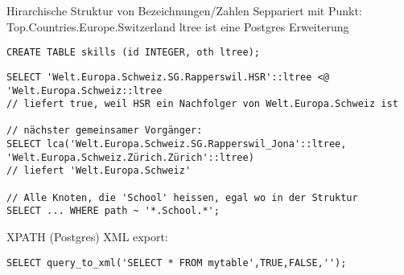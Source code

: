 \documentclass[ngerman,a4paper,12pt]{scrreprt}
\begin{document}
\ul
	\li Hirarchische Struktur von Bezeichnungen/Zahlen
	\li Seppariert mit Punkt: Top.Countries.Europe.Switzerland
	\li ltree ist eine Postgres Erweiterung
\ulE
\begin{verbatim}
CREATE TABLE skills (id INTEGER, oth ltree);
\end{verbatim}

\begin{verbatim}
SELECT 'Welt.Europa.Schweiz.SG.Rapperswil.HSR'::ltree <@ 'Welt.Europa.Schweiz::ltree
// liefert true, weil HSR ein Nachfolger von Welt.Europa.Schweiz ist

// nächster gemeinsamer Vorgänger:
SELECT lca('Welt.Europa.Schweiz.SG.Rapperswil_Jona'::ltree, 'Welt.Europa.Schweiz.Zürich.Zürich'::ltree)
// liefert 'Welt.Europa.Schweiz'

// Alle Knoten, die 'School' heissen, egal wo in der Struktur
SELECT ... WHERE path ~ '*.School.*';
\end{verbatim}

\ul
	\li XPATH (Postgres)
	\li XML export: 
		\begin{verbatim}SELECT query_to_xml('SELECT * FROM mytable',TRUE,FALSE,''); \end{verbatim}
\ulE
\end{document}
